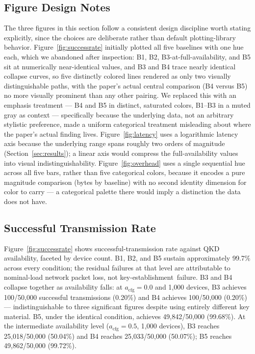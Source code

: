 \documentclass[journal]{IEEEtran}
\newcommand{\keyest}{key-establishment}
\newcommand{\acfg}{\ensuremath{a_{\text{cfg}}}}
\begin{document}
\subsection{Figure Design Notes}

The three figures in this section follow a consistent design discipline worth stating explicitly, since the choices are deliberate rather than default plotting-library behavior. Figure~\ref{fig:successrate} initially plotted all five baselines with one hue each, which we abandoned after inspection: B1, B2, B3-at-full-availability, and B5 sit at numerically near-identical values, and B3 and B4 trace nearly identical collapse curves, so five distinctly colored lines rendered as only two visually distinguishable paths, with the paper's actual central comparison (B4 versus B5) no more visually prominent than any other pairing. We replaced this with an emphasis treatment --- B4 and B5 in distinct, saturated colors, B1--B3 in a muted gray as context --- specifically because the underlying data, not an arbitrary stylistic preference, made a uniform categorical treatment misleading about where the paper's actual finding lives. Figure~\ref{fig:latency} uses a logarithmic latency axis because the underlying range spans roughly two orders of magnitude (Section~\ref{sec:results}); a linear axis would compress the full-availability values into visual indistinguishability. Figure~\ref{fig:overhead} uses a single sequential hue across all five bars, rather than five categorical colors, because it encodes a pure magnitude comparison (bytes by baseline) with no second identity dimension for color to carry --- a categorical palette there would imply a distinction the data does not have.

\subsection{Successful Transmission Rate}

Figure~\ref{fig:successrate} shows successful-transmission rate against QKD availability, faceted by device count. B1, B2, and B5 sustain approximately 99.7\% across every condition; the residual failures at that level are attributable to nominal-load network packet loss, not \keyest\ failure. B3 and B4 collapse together as availability falls: at $\acfg=0.0$ and 1{,}000 devices, B3 achieves 100/50{,}000 successful transmissions (0.20\%) and B4 achieves 100/50{,}000 (0.20\%) --- indistinguishable to three significant figures despite using entirely different key material. B5, under the identical condition, achieves 49{,}842/50{,}000 (99.68\%). At the intermediate availability level ($\acfg=0.5$, 1{,}000 devices), B3 reaches 25{,}018/50{,}000 (50.04\%) and B4 reaches 25{,}033/50{,}000 (50.07\%); B5 reaches 49{,}862/50{,}000 (99.72\%).
\end{document}
